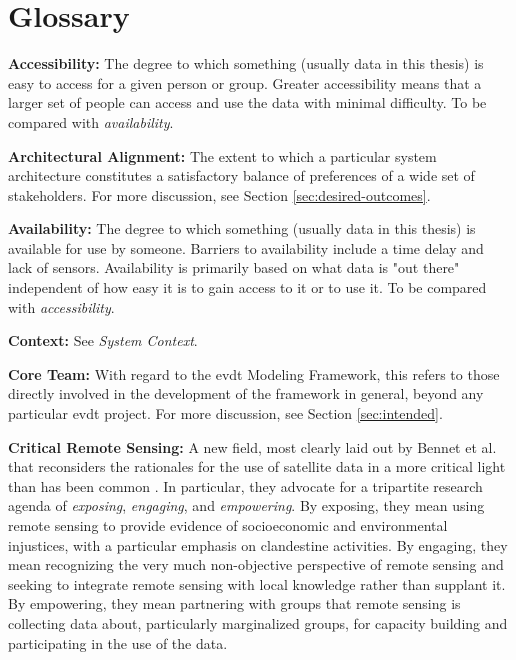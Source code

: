 \chapter{Glossary} \label{glossary}


\textbf{Accessibility:} The degree to which something (usually data in this thesis) is easy to access for a given person or group. Greater accessibility means that a larger set of people can access and use the data with minimal difficulty. To be compared with \textit{availability}.

\textbf{Architectural Alignment:} The extent to which a particular system architecture constitutes a satisfactory balance of preferences of a wide set of stakeholders. For more discussion, see Section \ref{sec:desired-outcomes}.

\textbf{Availability:} The degree to which something (usually data in this thesis) is available for use by someone. Barriers to availability include a time delay and lack of sensors. Availability is primarily based on what data is "out there" independent of how easy it is to gain access to it or to use it. To be compared with \textit{accessibility}. 


\textbf{Context:} See \textit{System Context}.

\textbf{Core Team:} With regard to the \ac{evdt} Modeling Framework, this refers to those directly involved in the development of the framework in general, beyond any particular \ac{evdt} project. For more discussion, see Section \ref{sec:intended}.

\textbf{Critical Remote Sensing:} A new field, most clearly laid out by Bennet et al. that reconsiders the rationales for the use of satellite data in a more critical light than has been common \cite{bennettPoliticsPixelsReview2022}. In particular, they advocate for a tripartite research agenda of \textit{exposing}, \textit{engaging}, and \textit{empowering}. By exposing, they mean using remote sensing to provide evidence of socioeconomic and environmental injustices, with a particular emphasis on clandestine activities. By engaging, they mean recognizing the very much non-objective perspective of remote sensing and seeking to integrate remote sensing with local knowledge rather than supplant it. By empowering, they mean partnering with groups that remote sensing is collecting data about, particularly marginalized groups, for capacity building and participating in the use of the data.

